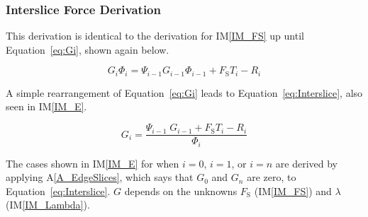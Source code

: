 \documentclass[12pt]{article}
\newcommand{\aref}[1]{A\ref{#1}}
\newcommand{\iref}[1]{IM\ref{#1}}
\begin{document}

\subsubsection*{Interslice Force Derivation} \label{sec:Ederivation}

This derivation is identical to the derivation for \iref{IM_FS} up until 
Equation~\ref{eq:Gi}, shown again below.

\begin{equation*}
G_i \Phi_i = \Psi_{i-1} G_{i-1} \Phi_{i-1} + 
F_\text{S} 
T_i - R_i
\end{equation*}

\noindent A simple rearrangement of Equation~\ref{eq:Gi} leads to 
Equation~\ref{eq:Interslice}, also seen in \iref{IM_E}.

\begin{equation}\label{eq:Interslice}
{G}_{i} = \frac{{\Psi_{i-1}}\;{{G}_{i-1}} +
  F_\text{S}{T_{i}} -
       {R_{i}}}{\Phi_{i}}
\end{equation}

\noindent The cases shown in \iref{IM_E} for when $i=0$, $i=1$, or $i=n$ are 
derived by 
applying \aref{A_EdgeSlices}, which says that $G_0$ and $G_n$ are zero, to 
Equation~\ref{eq:Interslice}. $G$ depends on the unknowns $F_\text{S}$ 
(\iref{IM_FS}) and $\lambda$ (\iref{IM_Lambda}).

~\newline

\end{document}
